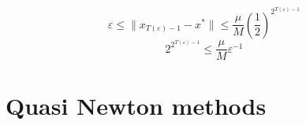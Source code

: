 \documentclass[12pt, openany]{report}
\theoremstyle{definition}
\begin{document}
\begin{equation}
	\varepsilon \leq \|x_{T(\varepsilon)-1}-x^*\| \leq \frac{\mu}{M} \left(\frac{1}{2}\right)^{2^{T(\varepsilon)-1}}
\end{equation}
\begin{equation}
	2^{2^{T(\varepsilon)-1}} \leq \frac{\mu}{M} \varepsilon^{-1}
\end{equation}
\begin{center}
	\color{red}
	\color{black}
\end{center}
	
\section{Quasi Newton methods}
\end{document}
